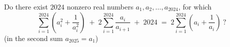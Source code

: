 \begin{problem}
    Do there exist \( 2024 \) nonzero real numbers \( a_1, a_2, \ldots, a_{2024} \), for which
    \[
        \sum_{i=1}^{2024} \left(a_i^2 + \frac{1}{a_i^2}\right) \;+\; 2\sum_{i=1}^{2024} \frac{a_i}{a_{i+1}} \;+\; 2024 \;=\; 2\sum_{i=1}^{2024} \left(a_i + \frac{1}{a_i}\right)\ ?
    \]
    (in the second sum \( a_{2025} = a_1 \))
\end{problem}
